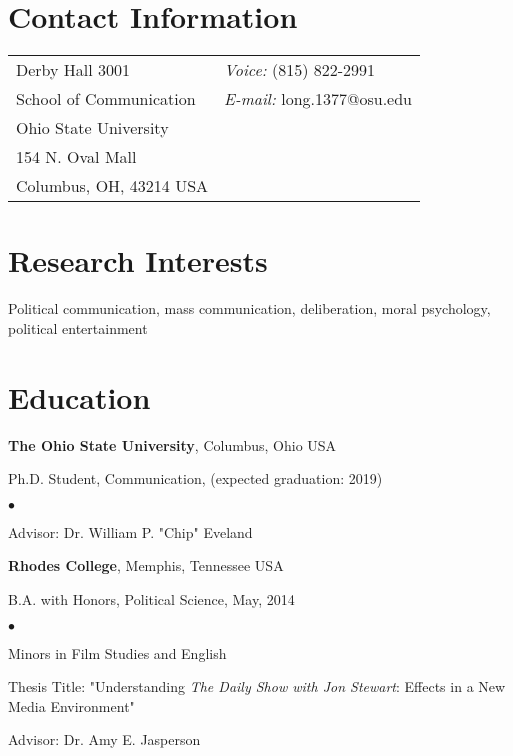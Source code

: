 \documentclass[margin,line]{res}
\newenvironment{list1}{
  \begin{list}{\ding{113}}{%
      \setlength{\itemsep}{0in}
      \setlength{\parsep}{0in} \setlength{\parskip}{0in}
      \setlength{\topsep}{0in} \setlength{\partopsep}{0in} 
      \setlength{\leftmargin}{0.17in}}}{\end{list}}
\newenvironment{list2}{
  \begin{list}{$\bullet$}{%
      \setlength{\itemsep}{0in}
      \setlength{\parsep}{0in} \setlength{\parskip}{0in}
      \setlength{\topsep}{0in} \setlength{\partopsep}{0in} 
      \setlength{\leftmargin}{0.2in}}}{\end{list}}
\begin{document}

\begin{resume}
\section{\sc Contact Information}
\vspace{.05in}
\begin{tabular}{@{}p{2in}p{4in}}
Derby Hall 3001           & {\it Voice:}  (815) 822-2991 \\            
School of Communication & {\it E-mail:}  long.1377@osu.edu\\         
Ohio State University \\ 
154 N. Oval Mall \\      
Columbus, OH, 43214 USA \\     
\end{tabular}


\section{\sc Research Interests}
Political communication, mass communication, deliberation, moral psychology, political entertainment

\section{\sc Education}
{\bf The Ohio State University}, Columbus, Ohio USA\\
\vspace*{-.1in}
\begin{list1}
\item[] Ph.D. Student, Communication, (expected graduation: 2019)
\begin{list2}
\vspace*{.05in}
\item Advisor: Dr. William P. "Chip" Eveland
\end{list2}
\end{list1}

{\bf Rhodes College}, Memphis, Tennessee USA\\
\vspace*{-.1in}
\begin{list1}
\item[] B.A. with Honors, Political Science,  May, 2014
\begin{list2}
\vspace*{.05in}
\item  Minors in Film Studies and English
\item Thesis Title: "Understanding {\em The Daily Show with Jon Stewart}: Effects in a New Media Environment"
\item Advisor: Dr. Amy E. Jasperson
\end{list2}
\end{list1}


\end{resume}
\end{document}
